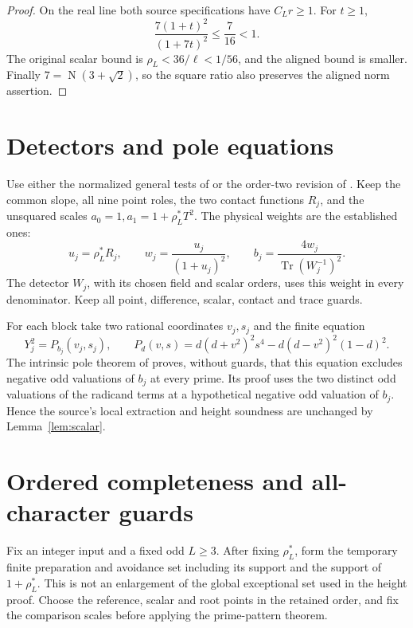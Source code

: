 \documentclass[11pt,a4paper]{article}
\DeclareMathOperator{\Tr}{Tr}\DeclareMathOperator{\Nm}{N}
\begin{document}
\begin{proof}
On the real line both source specifications have \(C_Lr\ge1\).
For \(t\ge1\),
\[
 \frac{7(1+t)^2}{(1+7t)^2}\le\frac7{16}<1.
\]
The original scalar bound is \(\rho_L<36/\ell<1/56\), and
the aligned bound is smaller. Finally
\(7=\Nm(3+\sqrt2)\), so the square ratio also preserves the
aligned norm assertion.
\end{proof}

\section{Detectors and pole equations}

Use either the normalized general tests of \cite{Reweighted} or the
order-two revision of \cite{Precision}. Keep the common slope, all
nine point roles, the two contact functions \(R_j\), and the
unsquared scales \(a_0=1,a_1=1+\rho_L^*T^2\).
The physical weights are the established ones:
\[
 u_j=\rho_L^*R_j,\qquad w_j=\frac{u_j}{(1+u_j)^2},
 \qquad b_j=\frac{4w_j}{\Tr(W_j^{-1})^2}.
\]
The detector \(W_j\), with its chosen field and scalar orders,
uses this weight in every denominator. Keep all point, difference,
scalar, contact and trace guards.

For each block take two rational coordinates \(v_j,s_j\) and
the finite equation
\begin{equation}\label{eq:pole}
 Y_j^2=P_{b_j}(v_j,s_j),\qquad
 P_d(v,s)=d(d+v^2)^2s^4-d(d-v^2)^2(1-d)^2.
\end{equation}
The intrinsic pole theorem of \cite{Intrinsic} proves, without
guards, that this equation excludes negative odd valuations of
\(b_j\) at every prime. Its proof uses the two distinct odd
valuations of the radicand terms at a hypothetical negative odd
valuation of \(b_j\).
Hence the source's local extraction and height soundness are
unchanged by Lemma~\ref{lem:scalar}.

\section{Ordered completeness and all-character guards}

Fix an integer input and a fixed odd \(L\ge3\). After fixing
\(\rho_L^*\), form the temporary finite preparation and avoidance
set including its support and the support of \(1+\rho_L^*\).
This is not an enlargement of the global exceptional set used
in the height proof. Choose the reference, scalar and root points
in the retained order, and fix the comparison scales before
applying the prime-pattern theorem.
\end{document}
